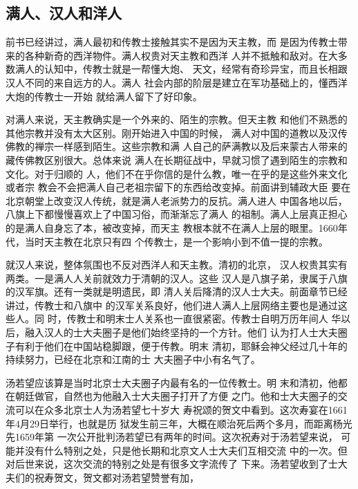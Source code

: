 \subsection{满人、汉人和洋人}
\par
前书已经讲过，满人最初和传教士接触其实不是因为天主教，而%
是因为传教士带来的各种新奇的西洋物件。满人权贵对天主教和西洋%
人并不抵触和敌对。在大多数满人的认知中，传教士就是一帮懂大炮、%
天文，经常有奇珍异宝，而且长相跟汉人不同的来自远方的人。满人%
社会内部的阶层是建立在军功基础上的，懂西洋大炮的传教士一开始%
就给满人留下了好印象。%
\par
对满人来说，天主教确实是一个外来的、陌生的宗教。但天主教%
和他们不熟悉的其他宗教并没有太大区别。刚开始进入中国的时候，%
满人对中国的道教以及汉传佛教的禅宗一样感到陌生。这些宗教和满%
人自己的萨满教以及后来蒙古人带来的藏传佛教区别很大。总体来说%
满人在长期征战中，早就习惯了遇到陌生的宗教和文化。对于归顺的%
人，他们不在乎你信的是什么教，唯一在乎的是这些外来文化或者宗%
教会不会把满人自己老祖宗留下的东西给改变掉。前面讲到辅政大臣%
要在北京朝堂上改变汉人传统，就是满人老派势力的反抗。满人进人%
中国各地以后，八旗上下都慢慢喜欢上了中国习俗，而渐渐忘了满人%
的祖制。满人上层真正担心的是满人自身忘了本，被改变掉，而天主%
教根本就不在满人上层的眼里。1660年代，当时天主教在北京只有四%
个传教士，是一个影响小到不值一提的宗教。%
\par
就汉人来说，整体氛围也不反对西洋人和天主教。清初的北京，%
汉人权贵其实有两类。一是满人人关前就效力于清朝的汉人。这些%
汉人是八旗子弟，隶属于八旗的汉军旗。还有一类就是明遗民，即%
清人关后降清的汉人士大夫。前面章节已经讲过，传教士和八旗中%
的汉军关系良好，他们进人满人上层网络主要也是通过这些人。同%
时，传教士和明末士人关系也一直很紧密。传教士自明万历年间人%
华以后，融入汉人的士大夫圈子是他们始终坚持的一个方针。他们%
认为打人士大夫圈子有利于他们在中国站稳脚跟，便于传教。明末%
清初，耶稣会神父经过几十年的持续努力，已经在北京和江南的士%
大夫圈子中小有名气了。%
\par
汤若望应该算是当时北京士大夫圈子内最有名的一位传教士。明%
末和清初，他都在朝廷做官，自然也为他融入士大夫圈子打开了方便%
之门。他和士大夫圈子的交流可以在众多北京士人为汤若望七十岁大%
寿祝颂的贺文中看到。这次寿宴在1661年4月29日举行，也就是历%
狱发生前三年，大概在顺治死后两个多月，而距离杨光先1659年第%
一次公开批判汤若望已有两年的时间。这次祝寿对于汤若望来说，%
可能并没有什么特别之处，只是他长期和北京文人士大夫们互相交流%
中的一次。但对后世来说，这次交流的特别之处是有很多文字流传了%
下来。汤若望收到了士大夫们的祝寿贺文，贺文都对汤若望赞誉有加，%
